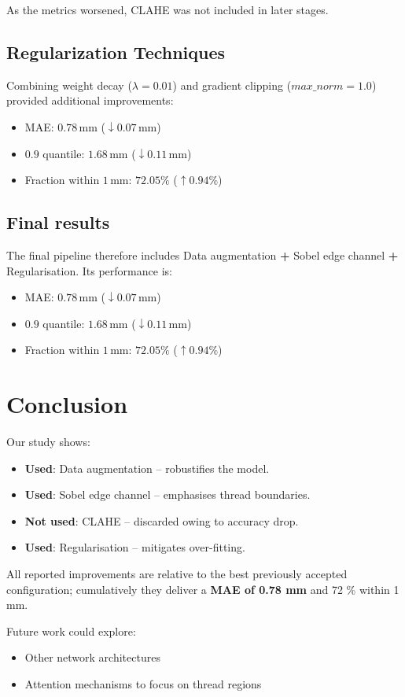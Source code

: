 \documentclass{article}
\begin{document}
As the metrics worsened, CLAHE was not included in later stages.

\subsection{Regularization Techniques}
Combining weight decay ($\lambda = 0.01$) and gradient clipping ($\textit{max\_norm}=1.0$)
provided additional improvements:

\begin{itemize}
    \item MAE: $0.78\,\text{mm}$ ($\downarrow 0.07\,\text{mm}$)
    \item $0.9$ quantile: $1.68\,\text{mm}$ ($\downarrow 0.11\,\text{mm}$)
    \item Fraction within $1\,\text{mm}$: $72.05\%$ ($\uparrow 0.94\%$)
\end{itemize}

\subsection{Final results}
The final pipeline therefore includes Data augmentation \textbf{+} Sobel edge channel \textbf{+} Regularisation. Its performance is:

\begin{itemize}
    \item MAE: $0.78\,\text{mm}$ ($\downarrow 0.07\,\text{mm}$)
    \item $0.9$ quantile: $1.68\,\text{mm}$ ($\downarrow 0.11\,\text{mm}$)
    \item Fraction within $1\,\text{mm}$: $72.05\%$ ($\uparrow 0.94\%$)
\end{itemize}

\section{Conclusion}

Our study shows:
\begin{itemize}
    \item \textbf{Used}: Data augmentation – robustifies the model.
    \item \textbf{Used}: Sobel edge channel – emphasises thread boundaries.
    \item \textbf{Not used}: CLAHE – discarded owing to accuracy drop.
    \item \textbf{Used}: Regularisation – mitigates over-fitting.
\end{itemize}

All reported improvements are relative to the best previously accepted configuration; cumulatively they deliver a \textbf{MAE of 0.78 mm} and 72 \% within 1 mm.

Future work could explore:
\begin{itemize}
    \item Other network architectures
    \item Attention mechanisms to focus on thread regions
\end{itemize}
\end{document}
